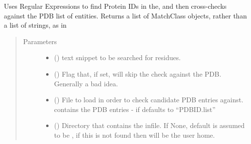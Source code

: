 \documentclass[letterpaper,10pt,english]{sphinxmanual}
\begin{document}
\begin{fulllineitems}
Uses Regular Expressions to find Protein IDs in the, and then cross-checks against the PDB list
of entities. Returns a list of MatchClass objects, rather than a list of strings, as in
\begin{quote}\begin{description}
\item[{Parameters}] \leavevmode\begin{itemize}
\item {} 
 () \textendash{} text snippet to be searched for residues.

\item {} 
 (\sphinxstyleliteralemphasis{\sphinxupquote{, }}\sphinxstyleliteralemphasis{\sphinxupquote{, }}) \textendash{} Flag that, if set, will skip the check against the PDB. Generally a bad idea.

\item {} 
 (\sphinxstyleliteralemphasis{\sphinxupquote{, }}\sphinxstyleliteralemphasis{\sphinxupquote{, }}) \textendash{} File to load in order to check candidate PDB entries against. contains the PDB entries -
if  defaults to “PDBID.list”

\item {} 
 (\sphinxstyleliteralemphasis{\sphinxupquote{, }}\sphinxstyleliteralemphasis{\sphinxupquote{, }}) \textendash{} Directory that contains the infile. If None, default is assumed to be , if this
is not found then will be the user home.


\end{itemize}
\end{description}
\end{quote}
\end{fulllineitems}
\end{document}
